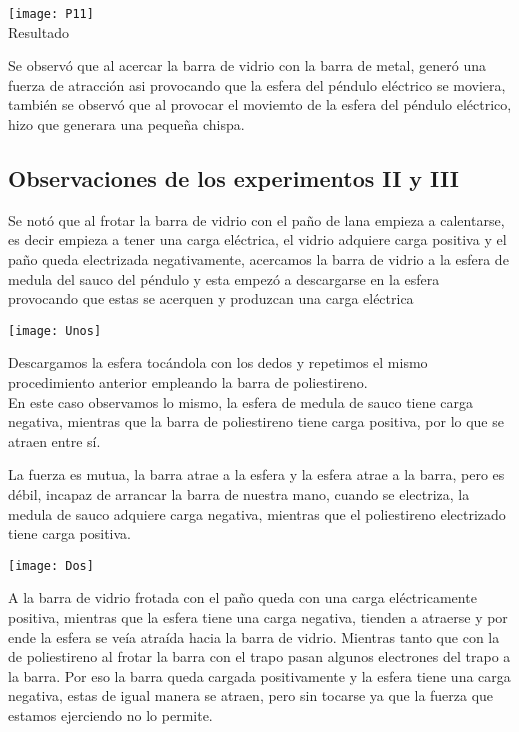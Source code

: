 \documentclass[10pt]{article}
\begin{document}
\begin{multicols}{2}
\begin{center}
		\texttt{[image: P11]}\\

		Resultado
	\end{center}

	Se observó que al acercar la barra de vidrio con la barra de metal, generó una fuerza de atracción asi provocando que la esfera del péndulo eléctrico se moviera, también se observó que al provocar el moviemto de la esfera del péndulo eléctrico, hizo que generara una pequeña chispa.
	\subsection{Observaciones de los experimentos II y III}
	Se notó que al frotar la barra de vidrio con el paño de lana empieza a calentarse, es decir empieza a tener una carga eléctrica, el vidrio adquiere carga positiva y el paño queda electrizada negativamente, acercamos la barra de vidrio a la esfera de medula del sauco del péndulo y esta empezó a descargarse en la esfera provocando que estas se acerquen y produzcan una carga eléctrica\\
		
	\begin{center}
			\texttt{[image: Unos]}\\

		\end{center}

	Descargamos la esfera tocándola con los dedos y repetimos el mismo procedimiento anterior empleando la barra de poliestireno. \\
	En este caso observamos lo mismo, la esfera de medula de sauco tiene carga negativa, mientras que la barra de poliestireno tiene carga positiva, por lo que se atraen entre sí.

	La fuerza es mutua, la barra atrae a la esfera y la esfera atrae a la barra, pero es débil, incapaz de arrancar la barra de nuestra mano, cuando se electriza, la medula de sauco adquiere carga negativa, mientras que el poliestireno electrizado tiene carga positiva.\\

		\begin{center}
			\texttt{[image: Dos]}\\

		\end{center}

	A la barra de vidrio frotada con el paño queda con una carga eléctricamente positiva, mientras que la esfera tiene una carga negativa, tienden a atraerse y por ende la esfera se veía atraída hacia la barra de vidrio.
	Mientras tanto que con la de poliestireno al frotar la barra con el trapo pasan algunos electrones del trapo a la barra. Por eso la barra queda cargada positivamente y la esfera tiene una carga negativa, estas de igual manera se atraen, pero sin tocarse ya que la fuerza que estamos ejerciendo no lo permite.


\end{multicols}
\end{document}
